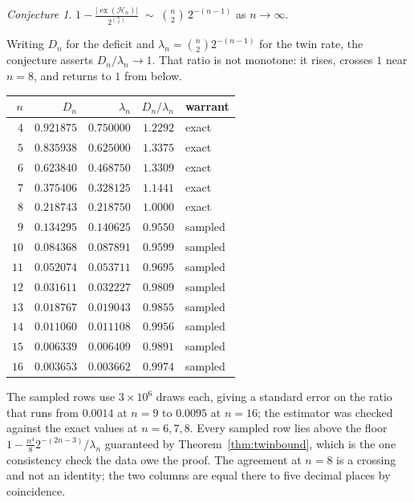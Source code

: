 \documentclass[11pt]{article}
\theoremstyle{definition}
\theoremstyle{remark}
\newtheorem{conjecture}[theorem]{Conjecture}
\newcommand{\Ha}{\mathcal{H}}
\newcommand{\ex}{\operatorname{ex}}
\begin{document}
\begin{conjecture}\label{conj:deficit}
$\displaystyle 1-\frac{|\ex(\Ha_n)|}{2^{\binom n2}}\;\sim\;\binom n2\,2^{-(n-1)}$ as
$n\to\infty$.
\end{conjecture}

Writing $D_n$ for the deficit and $\lambda_n=\binom n2 2^{-(n-1)}$ for the twin rate, the
conjecture asserts $D_n/\lambda_n\to1$. That ratio is not monotone: it rises, crosses $1$
near $n=8$, and returns to $1$ from below.

\begin{center}
\begin{tabular}{r|r|r|r|l}
$n$ & $D_n$ & $\lambda_n$ & $D_n/\lambda_n$ & warrant\\
\hline
$4$ & $0.921875$ & $0.750000$ & $1.2292$ & exact\\
$5$ & $0.835938$ & $0.625000$ & $1.3375$ & exact\\
$6$ & $0.623840$ & $0.468750$ & $1.3309$ & exact\\
$7$ & $0.375406$ & $0.328125$ & $1.1441$ & exact\\
$8$ & $0.218743$ & $0.218750$ & $1.0000$ & exact\\
$9$ & $0.134295$ & $0.140625$ & $0.9550$ & sampled\\
$10$ & $0.084368$ & $0.087891$ & $0.9599$ & sampled\\
$11$ & $0.052074$ & $0.053711$ & $0.9695$ & sampled\\
$12$ & $0.031611$ & $0.032227$ & $0.9809$ & sampled\\
$13$ & $0.018767$ & $0.019043$ & $0.9855$ & sampled\\
$14$ & $0.011060$ & $0.011108$ & $0.9956$ & sampled\\
$15$ & $0.006339$ & $0.006409$ & $0.9891$ & sampled\\
$16$ & $0.003653$ & $0.003662$ & $0.9974$ & sampled
\end{tabular}
\end{center}

The sampled rows use $3\times10^6$ draws each, giving a standard error on the ratio that
runs from $0.0014$ at $n=9$ to $0.0095$ at $n=16$; the estimator was checked against the
exact values at $n=6,7,8$. Every sampled row lies above the floor
$1-\tfrac{n^4}8 2^{-(2n-3)}/\lambda_n$ guaranteed by Theorem~\ref{thm:twinbound}, which is
the one consistency check the data owe the proof. The agreement at $n=8$ is a crossing and
not an identity; the two columns are equal there to five decimal places by coincidence.
\end{document}
